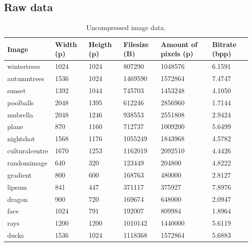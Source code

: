 \documentclass[12pt]{article}
\begin{document}
\subsection{Raw data}\label{rawdata}
\begin{table}[H]
	\centering
	{\singlespacing
		\begin{tabular}{llllll}
			\hline
			Image          & Width (p) & Heigth (p) & Filesize (B) & Amount of pixels (p) & Bitrate (bpp) \\ \hline
			wintertrees    & 1024      & 1024       & 807290       & 1048576              & 6.1591               \\
			autumntrees    & 1536      & 1024       & 1469590      & 1572864              & 7.4747               \\
			sunset         & 1392      & 1044       & 745703       & 1453248              & 4.1050               \\
			poolballs      & 2048      & 1395       & 612246       & 2856960              & 1.7144               \\
			umbrella       & 2048      & 1246       & 938553       & 2551808              & 2.9424               \\
			plane          & 870       & 1160       & 712737       & 1009200              & 5.6499               \\
			nightshot      & 1568      & 1176       & 1055249      & 1843968              & 4.5782               \\
			culturalcentre & 1670      & 1253       & 1162019      & 2092510              & 4.4426               \\
			randomimage    & 640       & 320        & 123449       & 204800               & 4.8222               \\
			gradient       & 800       & 600        & 168763       & 480000               & 2.8127               \\
			lipsum         & 841       & 447        & 371117       & 375927               & 7.8976               \\
			dragon         & 900       & 720        & 169674       & 648000               & 2.0947               \\
			face           & 1024      & 791        & 192007       & 809984               & 1.8964               \\
			rays           & 1200      & 1200       & 1010142      & 1440000              & 5.6119               \\
			ducks          & 1536      & 1024       & 1118368      & 1572864              & 5.6883               \\ \hline
	\end{tabular}}
	\caption{Uncompressed image data.}
	\label{uncompressedData}
\end{table}
\end{document}
